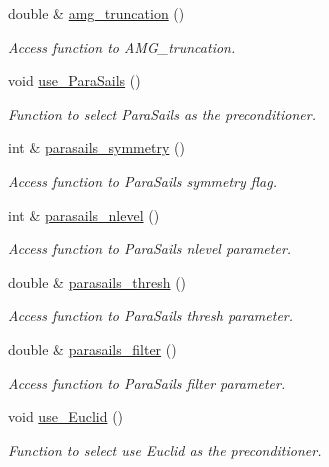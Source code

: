 \begin{DoxyCompactItemize}
double \& \hyperlink{classoomph_1_1HyprePreconditioner_a7394e9282d8422f8658966c5606bdb84}{amg\+\_\+truncation} ()
\begin{DoxyCompactList}\small\item\em Access function to A\+M\+G\+\_\+truncation. \end{DoxyCompactList}\item 
void \hyperlink{classoomph_1_1HyprePreconditioner_aacffb2fc026a5d1c4ead91b49e8002ae}{use\+\_\+\+Para\+Sails} ()
\begin{DoxyCompactList}\small\item\em Function to select Para\+Sails as the preconditioner. \end{DoxyCompactList}\item 
int \& \hyperlink{classoomph_1_1HyprePreconditioner_ab169873191bebd4dfa39455e8c2f3698}{parasails\+\_\+symmetry} ()
\begin{DoxyCompactList}\small\item\em Access function to Para\+Sails symmetry flag. \end{DoxyCompactList}\item 
int \& \hyperlink{classoomph_1_1HyprePreconditioner_a29559cc7a6c8247209a20d2031111529}{parasails\+\_\+nlevel} ()
\begin{DoxyCompactList}\small\item\em Access function to Para\+Sails nlevel parameter. \end{DoxyCompactList}\item 
double \& \hyperlink{classoomph_1_1HyprePreconditioner_a26a87703b9b18194ef57ad1f0ffed5bf}{parasails\+\_\+thresh} ()
\begin{DoxyCompactList}\small\item\em Access function to Para\+Sails thresh parameter. \end{DoxyCompactList}\item 
double \& \hyperlink{classoomph_1_1HyprePreconditioner_af7781e6421b33a38a2b473190d26df70}{parasails\+\_\+filter} ()
\begin{DoxyCompactList}\small\item\em Access function to Para\+Sails filter parameter. \end{DoxyCompactList}\item 
void \hyperlink{classoomph_1_1HyprePreconditioner_a8250d689c9788cbe028655fc7630aee9}{use\+\_\+\+Euclid} ()
\begin{DoxyCompactList}\small\item\em Function to select use Euclid as the preconditioner. \end{DoxyCompactList}\item 

\end{DoxyCompactItemize}

